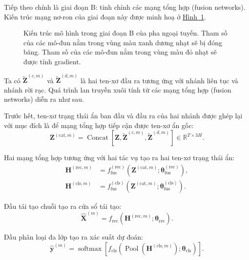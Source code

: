 Tiếp theo chính là giai đoạn B: tinh chỉnh các mạng tổng hợp (fusion networks). Kiến trúc mạng nơ-ron của giai đoạn này được minh hoạ ở \hyperref[fig:architecture-stage-B-offline-phase]
{Hình~\ref*{fig:architecture-stage-B-offline-phase}}.

\begin{figure}[H]
    \centering
    
    \caption[Kiến trúc mô hình trong giai đoạn B của pha ngoại tuyến.] {Kiến trúc mô hình trong giai đoạn B của pha ngoại tuyến. Tham số của các mô-đun nằm trong vùng màu xanh dương nhạt sẽ bị đóng băng. Tham số của các mô-đun nằm trong vùng màu đỏ nhạt sẽ được tính gradient.}
    \label{fig:architecture-stage-B-offline-phase}
\end{figure}

Ta có \(\widetilde{\mathbf{Z}}^{(c,m)}\) và
\(\widetilde{\mathbf{Z}}^{(d,m)}\) là hai ten-xơ đầu ra tương ứng với nhánh liên tục và nhánh rời rạc. Quá trình lan truyền xuôi tính từ các mạng tổng hợp (fusion networks) diễn ra như sau.

Trước hết, ten-xơ trạng thái ẩn ban đầu và đầu ra của hai nhánh được ghép lại với mục đích là để mạng tổng hợp tiếp cận được ten-xơ ẩn gốc:
\begin{equation}
\mathbf{Z}^{(\mathrm{cat},m)}
=
\operatorname{Concat}
\left[
\mathbf{Z},
\widetilde{\mathbf{Z}}^{(c,m)},
\widetilde{\mathbf{Z}}^{(d,m)}
\right]
\in
\mathbb{R}^{T\times 3H}.
\end{equation}

Hai mạng tổng hợp tương ứng với hai tác vụ tạo ra hai ten-xơ trạng thái ẩn:
\begin{align}
\mathbf{H}^{(\mathrm{rec},m)}
&=
f_{\mathrm{fus}}^{(\mathrm{rec})}
\left(
\mathbf{Z}^{(\mathrm{cat},m)};
\boldsymbol{\theta}_{\mathrm{fus}}^{(\mathrm{rec})}
\right),
\\
\mathbf{H}^{(\mathrm{cls},m)}
&=
f_{\mathrm{fus}}^{(\mathrm{cls})}
\left(
\mathbf{Z}^{(\mathrm{cat},m)};
\boldsymbol{\theta}_{\mathrm{fus}}^{(\mathrm{cls})}
\right).
\end{align}

Đầu tái tạo chuỗi tạo ra cửa sổ tái tạo:
\begin{equation}
\widehat{\mathbf{X}}^{(m)}
=
f_{\mathrm{rec}}
\left(
\mathbf{H}^{(\mathrm{rec},m)};
\boldsymbol{\theta}_{\mathrm{rec}}
\right).
\end{equation}

Đầu phân loại đa lớp tạo ra xác suất dự đoán:
\begin{equation}
\widehat{\mathbf{y}}^{(m)}
=
\operatorname{softmax}
\left[
f_{\mathrm{cls}}
\left(
\operatorname{Pool}
\left(
\mathbf{H}^{(\mathrm{cls},m)}
\right);
\boldsymbol{\theta}_{\mathrm{cls}}
\right)
\right].
\end{equation}

